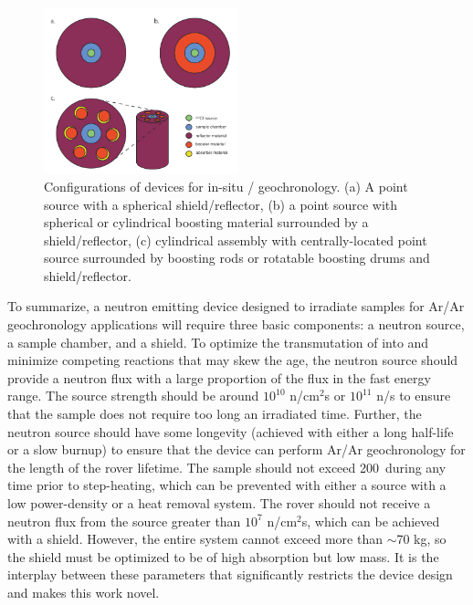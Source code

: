 \documentclass{mc2015}
\begin{document}
\begin{figure}
  \centering
  \includegraphics[width=0.5\textwidth]{Geometries.png}
  \caption{Configurations of devices for in-situ / geochronology. (a) A point source with a spherical shield/reflector, (b) a point source with spherical or cylindrical boosting material surrounded by a shield/reflector, (c) cylindrical assembly with centrally-located point source surrounded by boosting rods or rotatable boosting drums and shield/reflector.}
  \label{fig:geometries}
\end{figure}

To summarize, a neutron emitting device designed to irradiate samples for Ar/Ar geochronology applications will require three basic components: a neutron source, a sample chamber, and a shield. To optimize the transmutation of  into  and minimize competing reactions that may skew the age, the neutron source should provide a neutron flux with a large proportion of the flux in the fast energy range. The source strength should be around $10^{10}$ n/cm$^2$s or $10^{11}$ n/s to ensure that the sample does not require too long an irradiated time. Further, the neutron source should have some longevity (achieved with either a long half-life or a slow burnup) to ensure that the device can perform Ar/Ar geochronology for the length of the rover lifetime. The sample should not exceed 200\celsius\ during any time prior to step-heating, which can be prevented with either a source with a low power-density or a heat removal system. The rover should not receive a neutron flux from the source greater than $10^7$ n/cm$^2$s, which can be achieved with a shield. However, the entire system cannot exceed more than $\sim$70 kg, so the shield must be optimized to be of high absorption but low mass. It is the interplay between these parameters that significantly restricts the device design and makes this work novel. 
\end{document}
